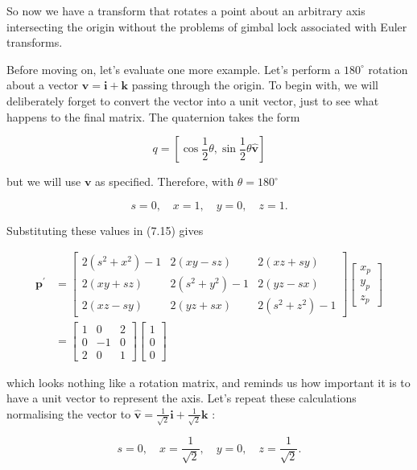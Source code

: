 So now we have a transform that rotates a point about an arbitrary axis intersecting the origin without the problems of gimbal lock associated with Euler transforms.

Before moving on, let's evaluate one more example. Let's perform a $180^{\circ}$ rotation about a vector $\mathbf{v}=\mathbf{i}+\mathbf{k}$ passing through the origin. To begin with, we will deliberately forget to convert the vector into a unit vector, just to see what happens to the final matrix. The quaternion takes the form

$$
q=\left[\cos \frac{1}{2} \theta, \sin \frac{1}{2} \theta \hat{\mathbf{v}}\right]
$$

but we will use $\mathbf{v}$ as specified. Therefore, with $\theta=180^{\circ}$

$$
s=0, \quad x=1, \quad y=0, \quad z=1 .
$$

Substituting these values in (7.15) gives

$$
\begin{aligned}
\mathbf{p}^{\prime} & =\left[\begin{array}{ccc}
2\left(s^{2}+x^{2}\right)-1 & 2(x y-s z) & 2(x z+s y) \\
2(x y+s z) & 2\left(s^{2}+y^{2}\right)-1 & 2(y z-s x) \\
2(x z-s y) & 2(y z+s x) & 2\left(s^{2}+z^{2}\right)-1
\end{array}\right]\left[\begin{array}{l}
x_{p} \\
y_{p} \\
z_{p}
\end{array}\right] \\
& =\left[\begin{array}{ccc}
1 & 0 & 2 \\
0 & -1 & 0 \\
2 & 0 & 1
\end{array}\right]\left[\begin{array}{l}
1 \\
0 \\
0
\end{array}\right]
\end{aligned}
$$

which looks nothing like a rotation matrix, and reminds us how important it is to have a unit vector to represent the axis. Let's repeat these calculations normalising the vector to $\hat{\mathbf{v}}=\frac{1}{\sqrt{2}} \mathbf{i}+\frac{1}{\sqrt{2}} \mathbf{k}$ :

$$
s=0, \quad x=\frac{1}{\sqrt{2}}, \quad y=0, \quad z=\frac{1}{\sqrt{2}} .
$$

